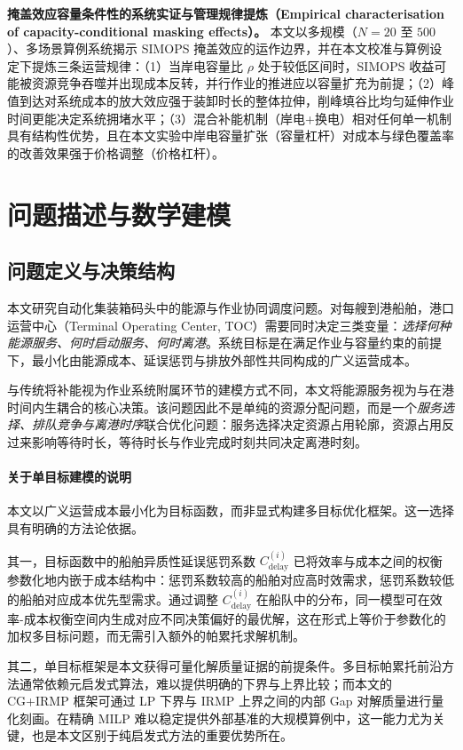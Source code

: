 \documentclass[UTF8, a4paper, 12pt]{ctexart}
\theoremstyle{plain}
\theoremstyle{definition}
\theoremstyle{remark}
\begin{document}
\textbf{掩盖效应容量条件性的系统实证与管理规律提炼（Empirical characterisation of capacity-conditional masking effects）。}
本文以多规模（$N = 20$ 至 $500$）、多场景算例系统揭示 SIMOPS 掩盖效应的运作边界，并在本文校准与算例设定下提炼三条运营规律：（1）当岸电容量比 $\rho$ 处于较低区间时，SIMOPS 收益可能被资源竞争吞噬并出现成本反转，并行作业的推进应以容量扩充为前提；（2）峰值到达对系统成本的放大效应强于装卸时长的整体拉伸，削峰填谷比均匀延伸作业时间更能决定系统拥堵水平；（3）混合补能机制（岸电+换电）相对任何单一机制具有结构性优势，且在本文实验中岸电容量扩张（容量杠杆）对成本与绿色覆盖率的改善效果强于价格调整（价格杠杆）。
\section{问题描述与数学建模}
\label{sec:model}

\subsection{问题定义与决策结构}
\label{sec:problem_definition_cn}

本文研究自动化集装箱码头中的能源与作业协同调度问题。对每艘到港船舶，港口运营中心（Terminal Operating Center, TOC）需要同时决定三类变量：\emph{选择何种能源服务、何时启动服务、何时离港}。系统目标是在满足作业与容量约束的前提下，最小化由能源成本、延误惩罚与排放外部性共同构成的广义运营成本。

与传统将补能视为作业系统附属环节的建模方式不同，本文将能源服务视为与在港时间内生耦合的核心决策。该问题因此不是单纯的资源分配问题，而是一个\emph{服务选择、排队竞争与离港时序}联合优化问题：服务选择决定资源占用轮廓，资源占用反过来影响等待时长，等待时长与作业完成时刻共同决定离港时刻。

\paragraph{关于单目标建模的说明}
本文以广义运营成本最小化为目标函数，而非显式构建多目标优化框架。这一选择具有明确的方法论依据。

其一，目标函数中的船舶异质性延误惩罚系数 $C^{(i)}_{\text{delay}}$ 已将效率与成本之间的权衡参数化地内嵌于成本结构中：惩罚系数较高的船舶对应高时效需求，惩罚系数较低的船舶对应成本优先型需求。通过调整 $C^{(i)}_{\text{delay}}$ 在船队中的分布，同一模型可在效率-成本权衡空间内生成对应不同决策偏好的最优解，这在形式上等价于参数化的加权多目标问题，而无需引入额外的帕累托求解机制。

其二，单目标框架是本文获得可量化解质量证据的前提条件。多目标帕累托前沿方法通常依赖元启发式算法，难以提供明确的下界与上界比较；而本文的 CG+IRMP 框架可通过 LP 下界与 IRMP 上界之间的内部 Gap 对解质量进行量化刻画。在精确 MILP 难以稳定提供外部基准的大规模算例中，这一能力尤为关键，也是本文区别于纯启发式方法的重要优势所在。
\end{document}
